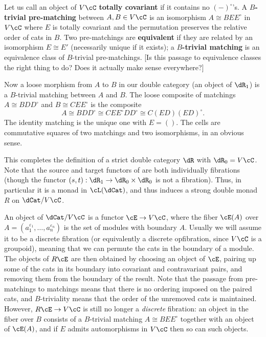 \documentclass{amsart}
\newcommand{\C}{\cC}
\newcommand{\E}{\cE}
\renewcommand{\o}{^{\circ}}
\newcommand{\e}[1][]{^{\varepsilon_{#1}}}
\begin{document}
Let us call an object of $V\C$ \textbf{totally covariant} if it contains no $(-)\o$'s.
A \textbf{$B$-trivial pre-matching} between $A,B\in V\C$ is an isomorphism $A \cong B E E\o$ in $V\C$ where $E$ is totally covariant and the permutation preserves the relative order of cats in $B$.
Two pre-matchings are \textbf{equivalent} if they are related by an isomorphism $E\cong E'$ (necessarily unique if it exists); a \textbf{$B$-trivial matching} is an equivalence class of $B$-trivial pre-matchings.
[Is this passage to equivalence classes the right thing to do?  Does it actually make sense everywhere?]

Now a loose morphism from $A$ to $B$ in our double category (an object of $\dR_1$) is a $B$-trivial matching between $A$ and $B$.
The loose composite of matchings $A\cong B D D\o$ and $B \cong C E E\o$ is the composite
\[ A\cong B D D\o \cong C E E\o D D\o \cong C (E D) (E D)\o. \]
The identity matching is the unique one with $E=()$.
The cells are commutative squares of two matchings and two isomorphisms, in an obvious sense.

This completes the definition of a strict double category $\dR$ with $\dR_0 = V\C$.
Note that the source and target functors of \dR are both individually fibrations (though the functor $(s,t):\dR_1 \to \dR_0\times \dR_0$ is not a fibration).
Thus, in particular it is a monad in $\cL(\dCat)$, and thus induces a strong double monad $R$ on $\dCat/V\C$.

An object of $\dCat/V\C$ is a functor $\E\to V\C$, where the fiber $\E(A)$ over $A=(a_1\e[1],\dots,a_n\e[n])$ is the set of modules with boundary $A$.
Usually we will assume it to be a discrete fibration (or equivalently a discrete opfibration, since $V\C$ is a groupoid), meaning that we can permute the cats in the boundary of a module.
The objects of $R\E$ are then obtained by choosing an object of $\E$, pairing up some of the cats in its boundary into covariant and contravariant pairs, and removing them from the boundary of the result.
Note that the passage from pre-matchings to matchings means that there is no ordering imposed on the paired cats, and $B$-triviality means that the order of the unremoved cats is maintained.
However, $R\E\to V\C$ is still no longer a \emph{discrete} fibration: an object in the fiber over $B$ consists of a $B$-trivial matching $A\cong BEE\o$ together with an object of $\E(A)$, and if $E$ admits automorphisms in $V\C$ then so can such objects.
\end{document}
